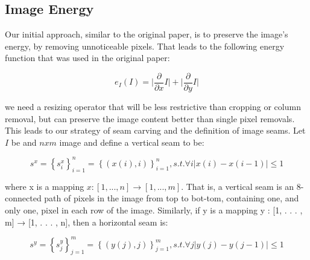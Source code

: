 \documentclass[conference]{acmsiggraph}
\begin{document}
\subsection{Image Energy}
Our initial approach, similar to the original paper, is to preserve the image's energy, by removing unnoticeable pixels. That leads to the following energy function that was used in the original paper:

\begin{equation}
e_I(I)=   \lvert \frac{\partial}{\partial x} I \rvert + \lvert  \frac{\partial}{\partial y} I 
\rvert 
\end{equation}

we need a resizing operator that will be less restrictive than cropping or column removal, but can preserve the image content better than single pixel removals. This leads to our strategy of seam carving and the definition of image seams. Let $I$ be and $n x m $ image and define a vertical seam to be:

\begin{equation}
s^{x} = { \left\{ s_{i}^{x} \right\}  }_{i=1}^{n} = 
{\left\{ (x(i),i) \right\}}_{i=1}^{n} ,s.t. \forall i \lvert x(i) - x(i - 1)  \rvert \leq 1
\end{equation}

where x is a mapping $x : [1, . . . , n] \longrightarrow [1, . . . , m]$. That is, a vertical seam is an 8-connected path of pixels in the image from top to bot-tom, containing one, and only one, pixel in each row of the image. Similarly, if y is a mapping y : [1, . . . , m] → [1, . . . , n], then a horizontal seam is:

\begin{equation}
s^{y} = { \left\{ s_{j}^{y} \right\}  }_{j=1}^{m} = 
{\left\{ (y(j),j) \right\}}_{j=1}^{m} ,s.t. \forall j \lvert y(j) - y(j - 1)  \rvert \leq 1
\end{equation}
\end{document}
